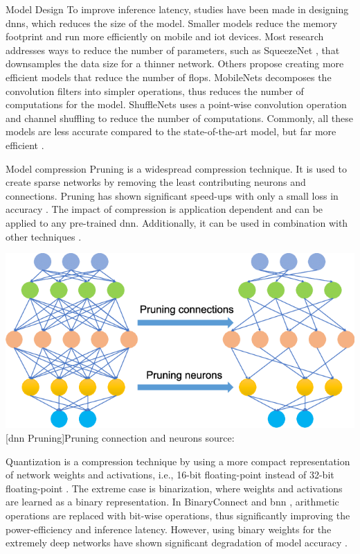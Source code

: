 \begin{enumdescript}
	\item[Model Design] To improve inference latency, studies have been made in designing \gls{dnn}s, which reduces the size of the model. Smaller models reduce the memory footprint and run more efficiently on mobile and \gls{iot} devices. Most research addresses ways to reduce the number of parameters, such as SqueezeNet \cite{iandola_squeezenet:_2016}, that downsamples the data size for a thinner network. Others propose creating more efficient models that reduce the number of \acrshort{flop}s. MobileNets \cite{howard_mobilenets:_2017,sandler_mobilenetv2:_2018} decomposes the convolution filters into simpler operations, thus reduces the number of computations for the model. ShuffleNets \cite{zhang_shufflenet:_2017, ma_shufflenet_2018} uses a point-wise convolution operation and channel shuffling to reduce the number of computations. Commonly, all these models are less accurate compared to the state-of-the-art model, but far more efficient \cite{bianco_benchmark_2018}. 
		
	\item[Model compression] Pruning is a widespread compression technique. It is used to create sparse networks by removing the least contributing neurons and connections. Pruning has shown significant speed-ups with only a small loss in accuracy \cite{zhou_edge_2019}. The impact of compression is application dependent and can be applied to any pre-trained \gls{dnn}. Additionally, it can be used in combination with other techniques \cite{cheng_survey_2017}.
	
	\begin{minipage}[t]{\linewidth}
		\centering
		\includegraphics[width=.4\linewidth]{figures/articles/Pruning-a-neural-network}
		[\gls{dnn} Pruning]{Pruning connection and neurons source:  \cite{chen_deep_2019}}
	\end{minipage}
	
	Quantization is a compression technique by using a more compact representation of network weights and activations, i.e., 16-bit floating-point instead of 32-bit floating-point \cite{cheng_survey_2017}. The extreme case is binarization, where weights and activations are learned as a binary representation. In BinaryConnect \cite{courbariaux_binaryconnect:_2015} and \gls{bnn} \cite{courbariaux_binarized_2016}, arithmetic operations are replaced with bit-wise operations, thus significantly improving the power-efficiency and inference latency. However, using binary weights for the extremely deep networks have shown significant degradation of model accuracy \cite{cheng_survey_2017}.
	

\end{enumdescript}
